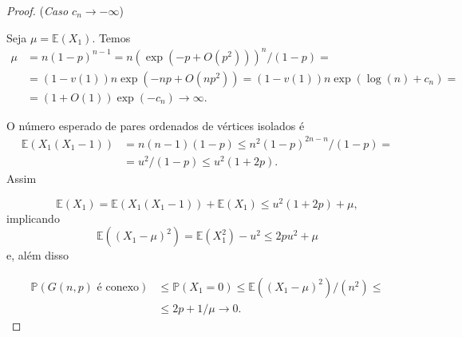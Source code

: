 \begin{proof}

(\emph{Caso $c_n \rightarrow -\infty$})

Seja $\mu = \mathbb{E}(X_1)$. Temos 
\begin{align*}
    \mu & = n(1 -p)^{n - 1} = n(\exp(-p + O(p^2)))^n / (1 - p) = \\
        & = (1 - v(1))n \exp(-np + O(np^2)) = (1 - v(1))n \exp(\log(n) + c_n) = \\
        & = (1 + O(1))\exp(-c_n) \rightarrow \infty.
\end{align*}{}

O número esperado de pares ordenados de vértices isolados é
\begin{align*}
    \mathbb{E}(X_1(X_1 - 1)) & = n(n-1)(1-p) \leq n^2 (1-p)^{2n -n}/ (1-p) = \\
                             & = u^2/(1 - p) \leq u^2 (1 + 2p).
\end{align*}
Assim

\begin{equation*}
    \mathbb{E}(X_1) = \mathbb{E}(X_1(X_1 - 1)) + \mathbb{E}(X_1) \leq u^2 (1 + 2p) + \mu,
\end{equation*}
implicando
\begin{equation*}
    \mathbb{E}((X_1 - \mu)^2) = \mathbb{E}(X_1^2) - u^2 \leq 2pu^2 + \mu
\end{equation*}
e, além disso

\begin{align*}
    \mathbb{P}(G(n,p) \text{ é conexo}) & \leq \mathbb{P}(X_1 = 0) \leq \mathbb{E}((X_1 - \mu)^2)/(n^2) \leq \\
    & \leq 2p + 1/\mu \rightarrow 0.
\end{align*}
\end{proof}